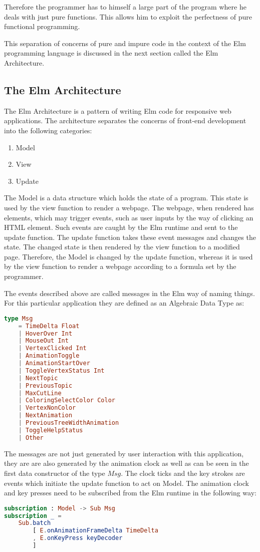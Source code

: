 Therefore the programmer has to himself a large part of the program where he
deals with just pure functions. This allows him to exploit the perfectness of
pure functional programming.

This separation of concerns of pure and impure code in the context of the Elm
programming language is discussed in the next section called the Elm
Architecture.

\subsection{The Elm Architecture}
The Elm Architecture is a pattern of writing Elm code for responsive web applications. 
The architecture separates the concerns of front-end development into the following categories:

\begin{enumerate}
\item Model
\item View
\item Update
\end{enumerate}

The Model is a data structure which holds the state of a program. This state is
used by the view function to render a webpage. The webpage, when rendered has
elements, which may trigger events, such as user inputs by the way of clicking
an HTML element. Such events are caught by the Elm runtime and sent to the update
function.  The update function takes these event messages and changes the
state. The changed state is then rendered by the view function to a modified
page.  Therefore, the Model is changed by the update function, whereas it is
used by the view function to render a webpage according to a formula set by the
programmer.

The events described above are called messages in the Elm way of naming things. For this particular
application they are defined as an Algebraic Data Type as:

\begin{lstlisting}[language=elm]
type Msg
    = TimeDelta Float
    | HoverOver Int
    | MouseOut Int
    | VertexClicked Int
    | AnimationToggle
    | AnimationStartOver
    | ToggleVertexStatus Int
    | NextTopic
    | PreviousTopic
    | MaxCutLine
    | ColoringSelectColor Color
    | VertexNonColor
    | NextAnimation 
    | PreviousTreeWidthAnimation
    | ToggleHelpStatus
    | Other
\end{lstlisting}
The messages are not just generated by user interaction with this application,
they are are also generated by the animation clock as well as can be seen in
the first data constructor of the type $Msg$.
The clock ticks and the key strokes are events which initiate the update function to act on Model.
The animation clock and key presses need to be subscribed from the Elm runtime in the following way:
\begin{lstlisting}[language=elm]
subscription : Model -> Sub Msg
subscription _ =
    Sub.batch
        [ E.onAnimationFrameDelta TimeDelta
        , E.onKeyPress keyDecoder
        ]
\end{lstlisting}

